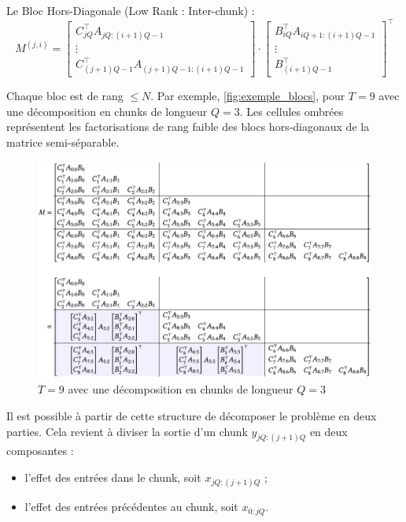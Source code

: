 Le Bloc Hors-Diagonale (Low Rank : Inter-chunk) :
\begin{equation}
    M^{(j,i)} =
    \left[
    \begin{array}{c}
        C_{jQ}^\top A_{jQ:(i+1)Q-1} \\
        \vdots \\
        C_{(j+1)Q - 1}^\top A_{(j+1)Q - 1:(i+1)Q - 1}
    \end{array}
    \right]
    \cdot
    \left[
    \begin{array}{c}
        B_{iQ}^\top A_{iQ+1:(i+1)Q -1} \\
        \vdots \\
        B_{(i+1)Q - 1}^\top
    \end{array}
    \right]^\top
\end{equation}

Chaque bloc est de rang \( \leq N \). Par exemple, \autoref{fig:exemple_blocs}, pour \( T = 9 \) avec une décomposition en chunks de longueur \( Q = 3 \). Les cellules ombrées représentent les factorisations de rang faible des blocs hors-diagonaux de la matrice semi-séparable.

\begin{figure}[H]
    \centering
    \includegraphics[width=1.0\linewidth]{images/matrices_semi_separables.png}
    \caption{\( T = 9 \) avec une décomposition en chunks de longueur \( Q = 3 \)}
    \label{fig:exemple_blocs}
\end{figure}

Il est possible à partir de cette structure de décomposer le problème en deux parties. Cela revient à diviser la sortie d’un chunk \( y_{jQ:(j+1)Q} \) en deux composantes :  
\begin{itemize}
    \item l’effet des entrées dans le chunk, soit \( x_{jQ:(j+1)Q} \) ;
    \item l’effet des entrées précédentes au chunk, soit \( x_{0:jQ} \).
\end{itemize}

